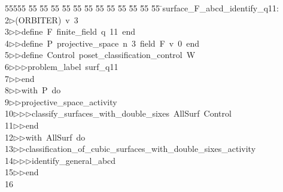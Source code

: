 %
%
\begin{tabbing}
55555 \= 55 \= 55 \= 55 \= 55 \= 55 \= 55 \= 55 \= 55 \= 55 \= 55 \= 55 \= 55 \= \>surface\_F\_abcd\_identify\_q11:\\[0pt]
2\>$\triangleright$\>(ORBITER)\ v\ 3\ \\[0pt]
3\>$\triangleright$\>$\triangleright$\>define\ F\ finite\_field\ q\ 11\ end\ \\[0pt]
4\>$\triangleright$\>$\triangleright$\>define\ P\ projective\_space\ n\ 3\ field\ F\ v\ 0\ end\ \\[0pt]
5\>$\triangleright$\>$\triangleright$\>define\ Control\ poset\_classification\_control\ W\ \\[0pt]
6\>$\triangleright$\>$\triangleright$\>$\triangleright$\>problem\_label\ surf\_q11\ \\[0pt]
7\>$\triangleright$\>$\triangleright$\>end\ \\[0pt]
8\>$\triangleright$\>$\triangleright$\>with\ P\ do\ \\[0pt]
9\>$\triangleright$\>$\triangleright$\>projective\_space\_activity\ \\[0pt]
10\>$\triangleright$\>$\triangleright$\>$\triangleright$\>classify\_surfaces\_with\_double\_sixes\ AllSurf\ Control\ \\[0pt]
11\>$\triangleright$\>$\triangleright$\>end\ \\[0pt]
12\>$\triangleright$\>$\triangleright$\>with\ AllSurf\ do\ \\[0pt]
13\>$\triangleright$\>$\triangleright$\>classification\_of\_cubic\_surfaces\_with\_double\_sixes\_activity\ \\[0pt]
14\>$\triangleright$\>$\triangleright$\>$\triangleright$\>identify\_general\_abcd\ \\[0pt]
15\>$\triangleright$\>$\triangleright$\>end\\[0pt]
16\>\end{tabbing}
